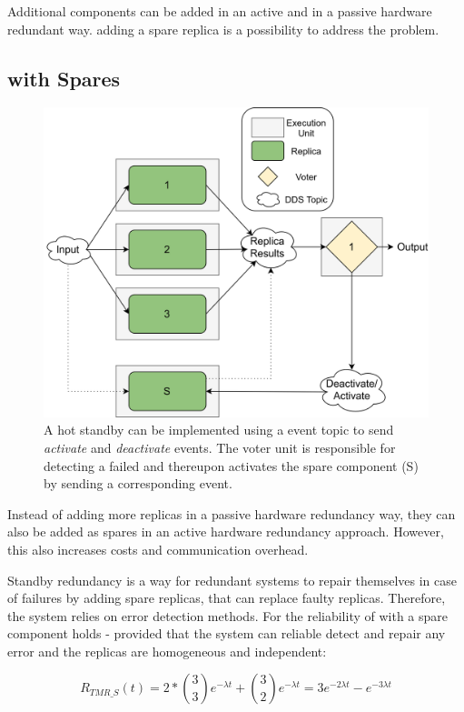Additional components can be added in an active and in a passive hardware redundant way.
adding a spare replica is a possibility to address the \ChallengeWR problem.

\subsection{ with Spares}
\begin{figure}[!hb]
	\centering
	\includegraphics[width=0.8\linewidth]{images/TMRWithSparesDDS}
	\caption{A hot standby can be implemented using a  event topic to send \textit{activate} and \textit{deactivate} events. The voter unit is responsible for detecting a failed and thereupon activates the spare component (S) by sending a corresponding event.}
	\label{fig:TMRWithSparesDDS}
\end{figure}

Instead of adding more replicas in a passive hardware redundancy way, they can also be added as spares in an active hardware redundancy approach.
However, this also increases costs and communication overhead.

Standby redundancy is a way for redundant systems to repair themselves in case of failures by adding spare replicas, that can replace faulty replicas.
Therefore, the system relies on error detection methods.
For the reliability of  with a spare component holds - provided that the system can reliable detect and repair any error and the replicas are homogeneous and independent:

\begin{equation}
R_{TMR\_S}(t) = 2 * {3 \choose 3} e^{-\lambda t} + {3 \choose 2} e^{-\lambda t}
 = 3e^{-2 \lambda t} - e^{-3 \lambda t}
\end{equation}

